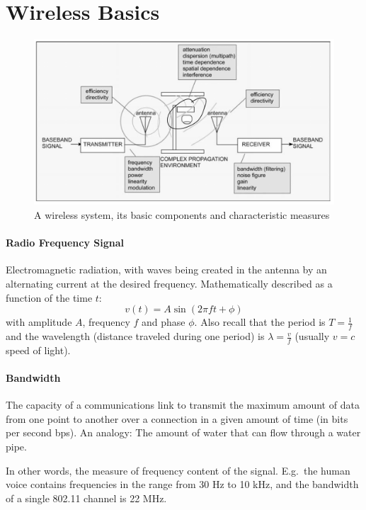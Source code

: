 \section{Wireless Basics}

\begin{figure}[h]
	\centering
	\includegraphics[scale=0.4]{images/1-wireless-system.png}
	\caption{A wireless system, its basic components and characteristic measures}%
	\label{fig:wireless-system}
\end{figure}

\paragraph{Radio Frequency Signal}
Electromagnetic radiation, with waves being created in the antenna by an
alternating current at the desired frequency. Mathematically described as a
function of the time $t$:
\[ v(t) = A \sin (2 \pi f t + \phi) \]
with amplitude $A$, frequency $f$ and phase $\phi$. Also recall that the period
is $T = \frac{1}{f}$ and the wavelength (distance traveled during one period)
is $\lambda = \frac{v}{f}$ (usually $v=c$ speed of light).

\paragraph{Bandwidth}
The capacity of a communications link to transmit the maximum amount of data
from one point to another over a connection in a given amount of time (in bits
per second bps). An analogy: The amount of water that can flow through a water
pipe.

In other words, the measure of frequency content of the signal. E.g.\ the human
voice contains frequencies in the range from 30 Hz to 10 kHz, and the bandwidth
of a single 802.11 channel is 22 MHz.


